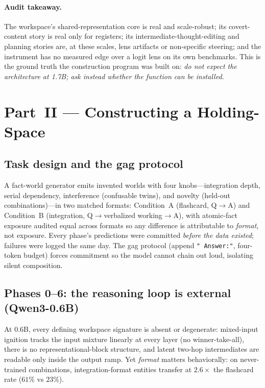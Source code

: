 \documentclass[11pt]{article}
\newcommand{\pct}{\%}
\begin{document}
\paragraph{Audit takeaway.} The workspace's shared-representation core is real and
scale-robust; its covert-content story is real only for registers; its
intermediate-thought-editing and planning stories are, at these scales, lens
artifacts or non-specific steering; and the instrument has no measured edge over a
logit lens on its own benchmarks. This is the ground truth the construction
program was built on: \emph{do not expect the architecture at 1.7B; ask instead
whether the function can be installed.}

\section{Part~II --- Constructing a Holding-Space}

\subsection{Task design and the gag protocol}

A fact-world generator emits invented worlds with four knobs---integration depth,
serial dependency, interference (confusable twins), and novelty (held-out
combinations)---in two matched formats: Condition~A (flashcard, Q$\to$A) and
Condition~B (integration, Q$\to$verbalized working$\to$A), with atomic-fact
exposure audited equal across formats so any difference is attributable to
\emph{format}, not exposure. Every phase's predictions were committed
\emph{before the data existed}; failures were logged the same day. The gag
protocol (append \texttt{"~Answer:"}, four-token budget) forces commitment so the
model cannot chain out loud, isolating silent composition.

\subsection{Phases 0--6: the reasoning loop is external (Qwen3-0.6B)}

At 0.6B, every defining workspace signature is absent or degenerate: mixed-input
ignition tracks the input mixture linearly at every layer (no winner-take-all),
there is no representational-block structure, and latent two-hop intermediates
are readable only inside the output ramp. Yet \emph{format} matters behaviorally:
on never-trained combinations, integration-format entities transfer at
$2.6\times$ the flashcard rate ($61\pct$ vs $23\pct$).
\end{document}
